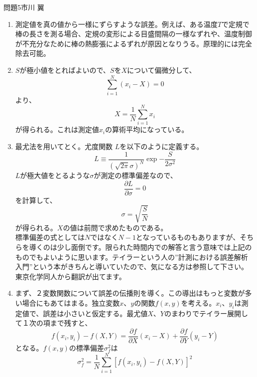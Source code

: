 \documentclass[fleqn]{jbook}
\begin{document}
\begin{answer}{問題5}{市川 翼}
\begin{enumerate}
	\item 測定値を真の値から一様にずらすような誤差。例えば、ある温度$T$で定規で棒の長さを測る場合、定規の変形による目盛間隔の一様なずれや、温度制御が不充分なために棒の熱膨張によるずれが原因となりうる。原理的には完全除去可能。
	\item $S$が極小値をとればよいので、$S$を$X$について偏微分して、
		\begin{equation}
		 \sum _{i=1} ^N (x_i - X) = 0
		\end{equation}
より、
		\begin{equation}
		 X = \frac{1}{N} \sum _{i=1} ^N x_i
		\end{equation}
が得られる。これは測定値$x_i$の算術平均になっている。
	\item 最尤法を用いてとく。尤度関数 $L$を以下のように定義する。
		\begin{equation}
		 L \equiv \frac{1}{(\sqrt{2\pi}\sigma)^N} \exp{-\frac{S}{2\sigma^2}}
		\end{equation}
$L$が極大値をとるような$\sigma$が測定の標準偏差なので、
		\begin{equation}
		 \frac{\partial L}{\partial \sigma} = 0
		\end{equation}
を計算して、
		\begin{equation}
		 \sigma = \sqrt{\frac{S}{N}}
		\end{equation}
が得られる。$X$の値は前問で求めたものである。\\
標準偏差の式としては$N$ではなく$N -1$となっているものもありますが、そちらを導くのは少し面倒です。限られた時間内での解答と言う意味では上記のものでもよいように思います。テイラーという人の''計測における誤差解析入門''という本がきちんと導いていたので、気になる方は参照して下さい。東京化学同人から翻訳が出てます。
	\item まず、２変数関数について誤差の伝播則を導く。この導出はもっと変数が多い場合にもあてはまる。独立変数$x$、$y$の関数$f(x,y)$を考える。$x_i$、$y_i$は測定値で、誤差は小さいと仮定する。最尤値$X$、$Y$のまわりでテイラー展開して１次の項まで残すと、
		\begin{equation}
		 f(x_i,y_i) - f(X,Y) = \frac{\partial f}{\partial X}(x_i - X)
 + \frac{\partial f}{\partial Y}(y_i - Y)
		\end{equation}
となる。$f(x,y)$の標準偏差$\sigma_{f}^{2}$は
		\begin{equation}
		 \sigma_{f}^{2} = \frac{1}{N} \sum _{i=1} ^N [f(x_i,y_i)
 - f(X,Y)]^2

\end{equation}
\end{enumerate}
\end{answer}
\end{document}
